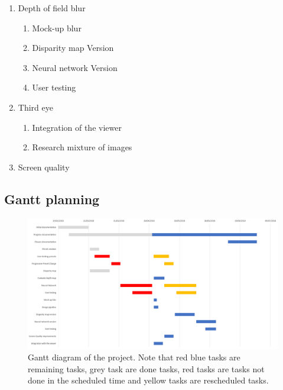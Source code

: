 \documentclass[10pt,a4paper,twocolumn,twoside]{article}
\begin{document}
\begin{enumerate}
		\item Depth of field blur
		\begin{enumerate}
			\item Mock-up blur
			\item Disparity map Version
			\item Neural network Version
			\item User testing
		\end{enumerate}
	
		\item \label{obj:third} Third eye
		\begin{enumerate}
			\item Integration of the viewer
			\item Research mixture of images
		\end{enumerate}
	
		\item Screen quality
	\end{enumerate}


	\begin{landscape}
		\section{Gantt planning}
		\begin{figure}[b!]
			\centering
			\includegraphics[width=1\linewidth]{img/gantt2}
			\caption{Gantt diagram of the project. Note that red blue tasks are remaining tasks, grey task are done tasks, red tasks are tasks not done in the scheduled time and yellow tasks are rescheduled tasks.}
			\label{fig:gantt}
		\end{figure}
		
	\end{landscape}
	
	
	
	
\end{document}

